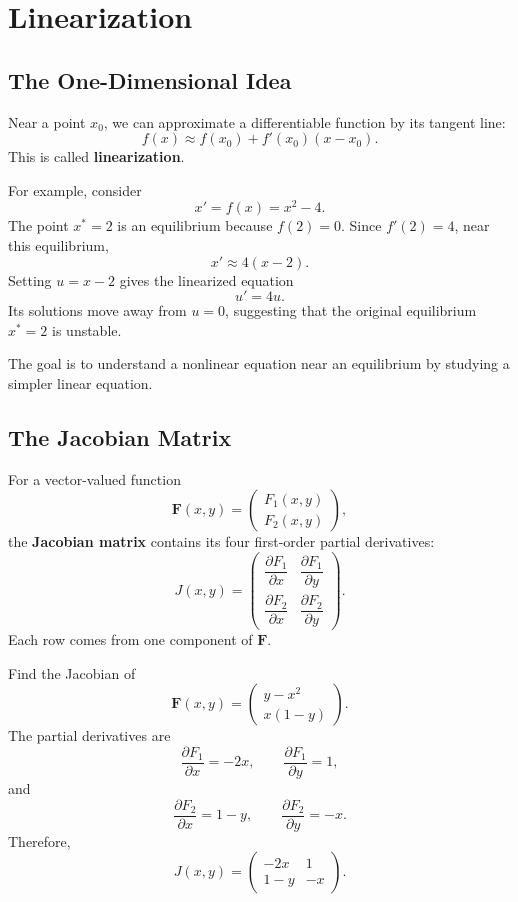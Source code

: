 \documentclass[10pt,letterpaper]{article}
\begin{document}
\section{Linearization}

\subsection{The One-Dimensional Idea}

Near a point $x_0$, we can approximate a differentiable
function by its tangent line:
\[
\boxed{
f(x)\approx f(x_0)+f'(x_0)(x-x_0).
}
\]
This is called \textbf{linearization}.

For example, consider
\[
x'=f(x)=x^2-4.
\]
The point $x^*=2$ is an equilibrium because $f(2)=0$.
Since $f'(2)=4$, near this equilibrium,
\[
x'\approx4(x-2).
\]
Setting $u=x-2$ gives the linearized equation
\[
u'=4u.
\]
Its solutions move away from $u=0$, suggesting that
the original equilibrium $x^*=2$ is unstable.

The goal is to understand a nonlinear equation near
an equilibrium by studying a simpler linear equation.

\subsection{The Jacobian Matrix}

For a vector-valued function
\[
\mathbf{F}(x,y)=
\begin{pmatrix}
F_1(x,y)\\
F_2(x,y)
\end{pmatrix},
\]
the \textbf{Jacobian matrix} contains its four first-order
partial derivatives:
\[
\boxed{
J(x,y)=
\begin{pmatrix}
\dfrac{\partial F_1}{\partial x}
&
\dfrac{\partial F_1}{\partial y}\\[6pt]
\dfrac{\partial F_2}{\partial x}
&
\dfrac{\partial F_2}{\partial y}
\end{pmatrix}.
}
\]
Each row comes from one component of $\mathbf{F}$.

\begin{example}[3]{
Find the Jacobian of
\[
\mathbf{F}(x,y)=
\begin{pmatrix}
y-x^2\\
x(1-y)
\end{pmatrix}.
\]
}
The partial derivatives are
\[
\frac{\partial F_1}{\partial x}=-2x,
\qquad
\frac{\partial F_1}{\partial y}=1,
\]
and
\[
\frac{\partial F_2}{\partial x}=1-y,
\qquad
\frac{\partial F_2}{\partial y}=-x.
\]
Therefore,
\[
\boxed{
J(x,y)=
\begin{pmatrix}
-2x&1\\
1-y&-x
\end{pmatrix}.
}
\]
\end{example}
\end{document}
